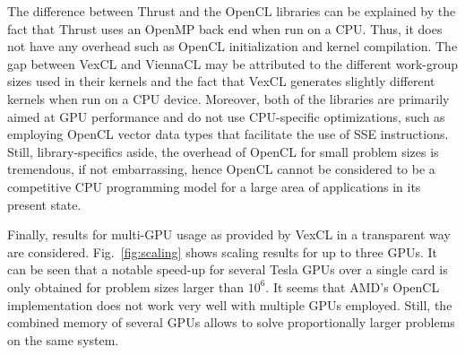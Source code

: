 \documentclass[final]{siamltex}
\newcommand{\figref}[1]{Fig.~\ref{#1}}
\begin{document}
The difference between Thrust and the OpenCL libraries can be explained by the
fact that Thrust uses an OpenMP back end when run on a CPU. Thus, it does not
have any overhead such as OpenCL initialization and kernel compilation.  The
gap between VexCL and ViennaCL may be attributed to the different work-group
sizes used in their kernels and the fact that VexCL generates slightly
different kernels when run on a CPU device. Moreover, both of the libraries are
primarily aimed at GPU performance and do not use CPU-specific optimizations,
such as employing OpenCL vector data types that facilitate the use of SSE
instructions.  Still, library-specifics aside, the overhead of OpenCL for small problem sizes is
tremendous, if not embarrassing, hence OpenCL cannot be considered to be a
competitive CPU programming model for a large area of applications in its
present state.

Finally, results for multi-GPU usage as provided by VexCL in a transparent way
are considered. \figref{fig:scaling} shows scaling results for up to three
GPUs. It can be seen that a notable speed-up for several Tesla GPUs over a
single card is only obtained for problem sizes larger than $10^6$.  It seems
that AMD's OpenCL implementation does not work very well with multiple GPUs
employed. Still, the combined memory of several GPUs allows to solve proportionally
larger problems on the same system.
\end{document}
